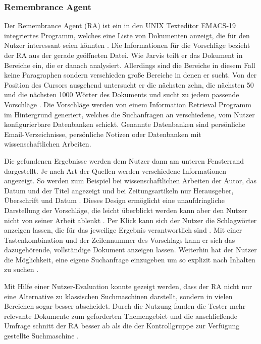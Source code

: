  	\subsubsection{Remembrance Agent}
 	Der Remembrance Agent (RA) ist ein in den UNIX Texteditor EMACS-19 integriertes Programm, welches eine Liste von Dokumenten anzeigt, die für den Nutzer interessant seien könnten \cite{rhodes2000thesis}. Die Informationen für die Vorschläge bezieht der RA aus der gerade geöffneten Datei. Wie Jarvis teilt er das Dokument in Bereiche ein, die er danach analysiert. Allerdings sind die Bereiche in diesem Fall keine Paragraphen sondern verschieden große Bereiche in denen er sucht. Von der Position des Cursors ausgehend untersucht er die nächsten zehn, die nächsten 50 und die nächsten 1000 Wörter des Dokuments und sucht zu jedem passende Vorschläge \cite{rhodes1996remembrance}. Die Vorschläge werden von einem Information Retrieval Programm im Hintergrund generiert, welches die Suchanfragen an verschiedene, vom Nutzer konfigurierbare Datenbanken schickt. Genannte Datenbanken sind persönliche Email-Verzeichnisse, persönliche Notizen oder Datenbanken mit wissenschaftlichen Arbeiten.

 	Die gefundenen Ergebnisse werden dem Nutzer dann am unteren Fensterrand dargestellt. Je nach Art der Quellen werden verschiedene Informationen angezeigt. So werden zum Beispiel bei wissenschaftlichen Arbeiten der Autor, das Datum und der Titel angezeigt und bei Zeitungsartikeln nur Herausgeber, Überschrift und Datum \cite{rhodes2000just}. Dieses Design ermöglicht eine unaufdringliche Darstellung der Vorschläge, die leicht überblickt werden kann aber den Nutzer nicht von seiner Arbeit ablenkt \cite{rhodes1996remembrance}. Per Klick kann sich der Nutzer die Schlagwörter anzeigen lassen, die für das jeweilige Ergebnis verantwortlich sind \cite{rhodes2000thesis}. Mit einer Tastenkombination und der Zeilennummer des Vorschlags kann er sich das dazugehörende, vollständige Dokument anzeigen lassen. Weiterhin hat der Nutzer die Möglichkeit, eine eigene Suchanfrage einzugeben um so explizit nach Inhalten zu suchen \cite{rhodes1996remembrance}.

 	Mit Hilfe einer Nutzer-Evaluation konnte gezeigt werden, dass der RA nicht nur eine Alternative zu klassischen Suchmaschinen darstellt, sondern in vielen Bereichen sogar besser abscheidet. Durch die Nutzung fanden die Tester mehr relevante Dokumente zum geforderten Themengebiet und die anschließende Umfrage schnitt der RA besser ab als die der Kontrollgruppe zur Verfügung gestellte Suchmaschine \cite{rhodes2000just}.

